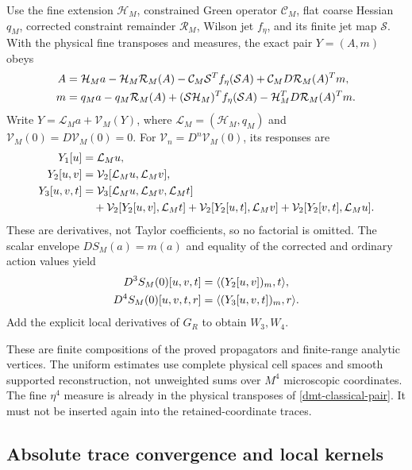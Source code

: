 \documentclass[11pt]{article}
\theoremstyle{remark}
\begin{document}
Use the fine extension \(\mathcal H_M\), constrained Green
operator \(\mathcal C_M\), flat coarse Hessian \(q_M\),
corrected constraint remainder \(\mathcal R_M\), Wilson
jet \(f_\eta\), and its finite jet map \(\mathcal S\).
With the physical fine transposes and measures, the exact
pair \(Y=(A,m)\) obeys
\begin{align}
 A={}&\mathcal H_Ma-\mathcal H_M\mathcal R_M(A)
       -\mathcal C_M\mathcal S^Tf_\eta(\mathcal SA)
       +\mathcal C_MD\mathcal R_M(A)^Tm,\notag\\
 m={}&q_Ma-q_M\mathcal R_M(A)
       +(\mathcal S\mathcal H_M)^Tf_\eta(\mathcal SA)
       -\mathcal H_M^TD\mathcal R_M(A)^Tm.
 \label{dmt-classical-pair}
\end{align}
Write \(Y=\mathcal L_Ma+\mathcal V_M(Y)\), where
\(\mathcal L_M=(\mathcal H_M,q_M)\) and
\(\mathcal V_M(0)=D\mathcal V_M(0)=0\).
For \(\mathcal V_n=D^n\mathcal V_M(0)\), its responses are
\begin{align}
 Y_1[u]&=\mathcal L_Mu,\notag\\
 Y_2[u,v]&=\mathcal V_2[\mathcal L_Mu,\mathcal L_Mv],\notag\\
 Y_3[u,v,t]&=\mathcal V_3[
                  \mathcal L_Mu,\mathcal L_Mv,\mathcal L_Mt]\notag\\
 &\quad+\mathcal V_2[Y_2[u,v],\mathcal L_Mt]
       +\mathcal V_2[Y_2[u,t],\mathcal L_Mv]
       +\mathcal V_2[Y_2[v,t],\mathcal L_Mu].
 \label{dmt-classical-response-recursion}
\end{align}
These are derivatives, not Taylor coefficients, so no factorial
is omitted. The scalar envelope \(DS_M(a)=m(a)\) and equality
of the corrected and ordinary action values yield
\begin{align}
 D^3S_M(0)[u,v,t]
       &=\langle(Y_2[u,v])_m,t\rangle,\notag\\
 D^4S_M(0)[u,v,t,r]
       &=\langle(Y_3[u,v,t])_m,r\rangle.
 \label{dmt-classical-scalar-vertices}
\end{align}
Add the explicit local derivatives of \(G_R\) to obtain
\(W_3,W_4\).

These are finite compositions of the proved propagators and
finite-range analytic vertices. The uniform estimates use
complete physical cell spaces and smooth supported
reconstruction, not unweighted sums over \(M^4\) microscopic
coordinates. The fine \(\eta^4\) measure is already in the
physical transposes of \eqref{dmt-classical-pair}. It must
not be inserted again into the retained-coordinate traces.

\subsection{Absolute trace convergence and local kernels}
\label{dmt-convergence-section}
\end{document}
